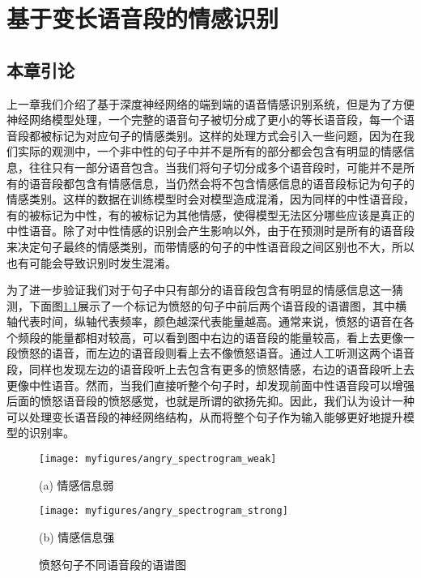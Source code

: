 \chapter{基于变长语音段的情感识别}
\label{cha:var_len}

\section{本章引论}
\label{sec:var_len_intro}

上一章我们介绍了基于深度神经网络的端到端的语音情感识别系统，但是为了方便神经网络模型处理，一个完整的语音句子被切分成了更小的等长语音段，每一个语音段都被标记为对应句子的情感类别。这样的处理方式会引入一些问题，因为在我们实际的观测中，一个非中性的句子中并不是所有的部分都会包含有明显的情感信息，往往只有一部分语音包含。当我们将句子切分成多个语音段时，可能并不是所有的语音段都包含有情感信息，当仍然会将不包含情感信息的语音段标记为句子的情感类别。这样的数据在训练模型时会对模型造成混淆，因为同样的中性语音段，有的被标记为中性，有的被标记为其他情感，使得模型无法区分哪些应该是真正的中性语音。除了对中性情感的识别会产生影响以外，由于在预测时是所有的语音段来决定句子最终的情感类别，而带情感的句子的中性语音段之间区别也不大，所以也有可能会导致识别时发生混淆。

为了进一步验证我们对于句子中只有部分的语音段包含有明显的情感信息这一猜测，下面图\ref{fig:angry_spectrogram}展示了一个标记为愤怒的句子中前后两个语音段的语谱图，其中横轴代表时间，纵轴代表频率，颜色越深代表能量越高。通常来说，愤怒的语音在各个频段的能量都相对较高，可以看到图中右边的语音段的能量较高，看上去更像一段愤怒的语音，而左边的语音段则看上去不像愤怒语音。通过人工听测这两个语音段，同样也发现左边的语音段听上去包含有更多的愤怒情感，右边的语音段听上去更像中性语音。然而，当我们直接听整个句子时，却发现前面中性语音段可以增强后面的愤怒语音段的愤怒感觉，也就是所谓的欲扬先抑。因此，我们认为设计一种可以处理变长语音段的神经网络结构，从而将整个句子作为输入能够更好地提升模型的识别率。

\begin{figure}[htb]
\begin{minipage}{0.48\textwidth}
    \centering
    \texttt{[image: myfigures/angry\_spectrogram\_weak]}
    \centerline{(a) 情感信息弱}\medskip
\end{minipage}\hfill
\begin{minipage}{0.48\textwidth}
    \centering
    \texttt{[image: myfigures/angry\_spectrogram\_strong]}
    \centerline{(b) 情感信息强}\medskip
\end{minipage}
\caption{愤怒句子不同语音段的语谱图}
\label{fig:angry_spectrogram}
\end{figure}

